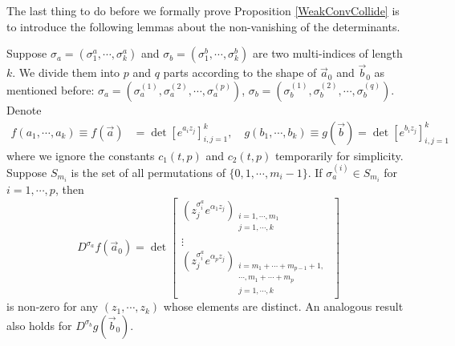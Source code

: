 The last thing to do before we formally prove Proposition \ref{WeakConvCollide} is to introduce the following lemmas about the non-vanishing of the determinants.

\begin{lemma}{\label{NonVanish}}
	Suppose $\sigma_{a}=(\sigma_{1}^{a},\cdots,\sigma_{k}^{a})$ and $\sigma_{b}=(\sigma_{1}^{b},\cdots,\sigma_{k}^{b})$ are two multi-indices of length $k$. We divide them into $p$ and $q$ parts according to the shape of $\vec{a}_{0}$ and $\vec{b}_{0}$ as mentioned before: $\sigma_{a}=(\sigma^{(1)}_{a},\sigma^{(2)}_{a},\cdots,\sigma^{(p)}_{a})$, $\sigma_{b}=(\sigma^{(1)}_{b},\sigma^{(2)}_{b},\cdots,\sigma^{(q)}_{b})$. Denote 
	\begin{align*}
	f(a_{1},\cdots,a_{k})\equiv f(\vec{a})&=\det[e^{a_{i}z_{j}}]_{i,j=1}^{k},\quad g(b_{1},\cdots,b_{k})\equiv g(\vec{b})=\det[e^{b_{i}z_{j}}]_{i,j=1}^{k}
\end{align*} where we ignore the constants $c_{1}(t,p)$ and $c_{2}(t,p)$ temporarily for simplicity. Suppose $S_{m_i}$ is the set of all permutations of $\{0,1,\cdots,m_{i}-1\}$. If $\sigma_{a}^{(i)}\in S_{m_i}$ for $i=1,\cdots,p$, then 
\[ D^{\sigma_{a}}f(\vec{a}_{0})= \det
	\left[ \begin{array}{ccc}
		(z_{j}^{\sigma_{i}^{a}}e^{\alpha_{1}z_{j}})_{\substack{i=1,\cdots,m_{1}\\j=1,\cdots,k}}\\
	\vdots\\
	(z_{j}^{\sigma_{i}^{a}}e^{\alpha_{p}z_{j}})_{\substack{i=m_1+\cdots+m_{p-1}+1,\\ \cdots ,m_{1}+\cdots +m_{p} \\j=1,\cdots,k}}
	\end{array}
	\right]
\]
is non-zero for any $(z_{1},\cdots,z_{k})$ whose elements are distinct. An analogous result also holds for $D^{\sigma_{b}}g(\vec{b}_{0})$.
\end{lemma}

